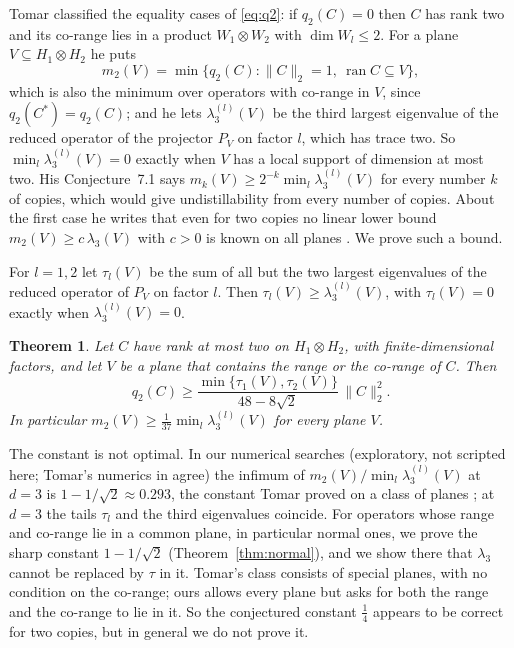 \documentclass[11pt]{article}
\newtheorem{theorem}{Theorem}
\theoremstyle{remark}
\newcommand{\norm}[1]{\lVert #1\rVert}
\begin{document}
Tomar \cite{Tomar2} classified the equality cases of \eqref{eq:q2}: if $q_2(C)=0$ then $C$ has rank two and its co-range
lies in a product $W_1\otimes W_2$ with $\dim W_l\le2$. For a plane $V\subseteq H_1\otimes H_2$ he puts
\[
m_2(V)=\min\{q_2(C):\norm{C}_2=1,\ \operatorname{ran}C\subseteq V\},
\]
which is also the minimum over operators with co-range in $V$, since $q_2(C^*)=q_2(C)$; and he lets $\lambda_3^{(l)}(V)$ be the third largest eigenvalue of the reduced operator of the projector $P_V$ on factor
$l$, which has trace two. So $\min_l\lambda_3^{(l)}(V)=0$ exactly when $V$ has a local support of dimension at most
two. His Conjecture~7.1 says $m_k(V)\ge2^{-k}\min_l\lambda_3^{(l)}(V)$ for every number $k$ of copies, which would give
undistillability from every number of copies. About the first case he writes that even for two copies no linear lower
bound $m_2(V)\ge c\,\lambda_3(V)$ with $c>0$ is known on all planes \cite[Sec.~8]{Tomar2}. We prove such a bound.

For $l=1,2$ let $\tau_l(V)$ be the sum of all but the two largest eigenvalues of the reduced operator of $P_V$ on factor
$l$. Then $\tau_l(V)\ge\lambda_3^{(l)}(V)$, with $\tau_l(V)=0$ exactly when $\lambda_3^{(l)}(V)=0$.

\begin{theorem}\label{thm:main}
Let $C$ have rank at most two on $H_1\otimes H_2$, with finite-dimensional factors, and let $V$ be a plane that contains
the range or the co-range of $C$. Then
\[
q_2(C)\ge\frac{\min\{\tau_1(V),\tau_2(V)\}}{48-8\sqrt2}\,\norm{C}_2^2 .
\]
In particular $m_2(V)\ge\frac1{37}\min_l\lambda_3^{(l)}(V)$ for every plane $V$.
\end{theorem}

The constant is not optimal. In our numerical searches (exploratory, not scripted here; Tomar's numerics in \cite[Sec.~7]{Tomar2} agree) the infimum of $m_2(V)/\min_l\lambda_3^{(l)}(V)$ at $d=3$ is
$1-1/\sqrt2\approx0.293$, the constant Tomar proved on a class of planes \cite[Thm.~7.2]{Tomar2}; at $d=3$ the tails
$\tau_l$ and the third eigenvalues coincide. For operators whose range and co-range lie in a common plane, in
particular normal ones, we prove the sharp constant $1-1/\sqrt2$ (Theorem~\ref{thm:normal}), and we show there that
$\lambda_3$ cannot be replaced by $\tau$ in it. Tomar's class consists of special planes, with no condition on the
co-range; ours allows every plane but asks for both the range and the co-range to lie in it. So the conjectured constant $\frac14$ appears to be correct for two
copies, but in general we do not prove it.
\end{document}
